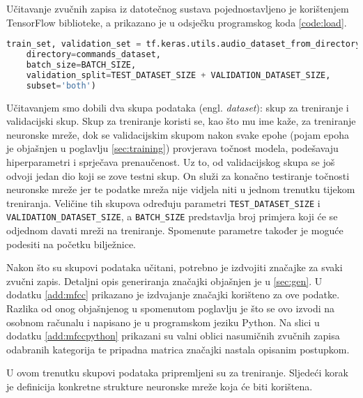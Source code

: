 Učitavanje zvučnih zapisa iz datotečnog sustava pojednostavljeno je korištenjem
TensorFlow biblioteke, a prikazano je u odsječku programskog koda \ref{code:load}.

\begin{lstlisting}[language=Python, caption=Učitavanje zvučnih zapisa, label=code:load]
train_set, validation_set = tf.keras.utils.audio_dataset_from_directory(
    directory=commands_dataset,
    batch_size=BATCH_SIZE,
    validation_split=TEST_DATASET_SIZE + VALIDATION_DATASET_SIZE,
    subset='both')
\end{lstlisting}

Učitavanjem smo dobili dva skupa podataka (engl. \textit{dataset}): skup za treniranje i validacijski skup.
Skup za treniranje koristi se, kao što mu ime kaže, za treniranje neuronske mreže,
dok se validacijskim skupom nakon svake epohe (pojam epoha je objašnjen u poglavlju \ref{sec:training}) 
provjerava točnost modela, podešavaju
hiperparametri i sprječava prenaučenost.
Uz to, od validacijskog skupa se još odvoji jedan dio koji se zove testni skup. On služi
za konačno testiranje točnosti neuronske mreže jer te podatke mreža nije vidjela niti
u jednom trenutku tijekom treniranja. Veličine tih skupova određuju parametri 
\texttt{TEST\_DATASET\_SIZE} i \texttt{VALIDATION\_DATASET\_SIZE}, a \texttt{BATCH\_SIZE} predstavlja
broj primjera koji će se odjednom davati mreži na treniranje. Spomenute parametre
također je moguće podesiti na početku bilježnice. 

Nakon što su skupovi podataka učitani, potrebno je izdvojiti značajke za svaki zvučni zapis.
Detaljni opis generiranja značajki objašnjen je u \ref{sec:gen}. U dodatku \ref{add:mfcc} prikazano
je izdvajanje značajki korišteno za ove podatke. Razlika od onog objašnjenog u spomenutom poglavlju
je što se ovo izvodi na osobnom računalu i napisano je u programskom jeziku Python.
Na slici u dodatku \ref{add:mfccpython} prikazani su valni oblici nasumičnih zvučnih zapisa odabranih 
kategorija te pripadna matrica značajki nastala opisanim postupkom.

U ovom trenutku skupovi podataka pripremljeni su za treniranje. Sljedeći korak je definicija 
konkretne strukture neuronske mreže koja će biti korištena.